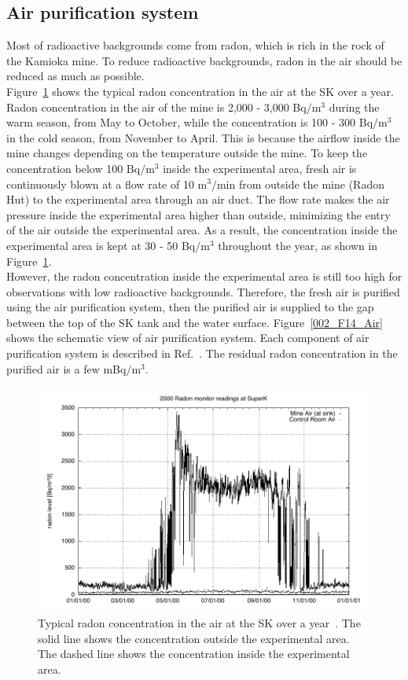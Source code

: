 \subsection{Air purification system}
\vs\hs Most of radioactive backgrounds come from radon, which is rich in the rock of the Kamioka mine.
To reduce radioactive backgrounds, radon in the air should be reduced as much as possible.\\
\hs Figure~\ref{002_F15_AirSeason} shows the typical radon concentration in the air at the SK over a year.
Radon concentration in the air of the mine is 2,000 - 3,000 Bq$/$m$^{\text{3}}$ during the warm season, from May to October, while the concentration is 100 - 300 Bq$/$m$^{\text{3}}$ in the cold season, from November to April.
This is because the airflow inside the mine changes depending on the temperature outside the mine.
To keep the concentration below 100 Bq$/$m$^{\text{3}}$ inside the experimental area, fresh air is continuously blown at a flow rate of 10 m$^{\text{3}}/$min from outside the mine (Radon Hut) to the experimental area through an air duct.
The flow rate makes the air pressure inside the experimental area higher than outside, minimizing the entry of the air outside the experimental area.
As a result, the concentration inside the experimental area is kept at 30 - 50 Bq$/$m$^{\text{3}}$ throughout the year, as shown in Figure~\ref{002_F15_AirSeason}.\\
\hs However, the radon concentration inside the experimental area is still too high for observations with low radioactive backgrounds.
Therefore, the fresh air is purified using the air purification system, then the purified air is supplied to the gap between the top of the SK tank and the water surface.
Figure~\ref{002_F14_Air} shows the schematic view of air purification system.
Each component of air purification system is described in Ref.~\cite{2015NakanoPhD}.
The residual radon concentration in the purified air is a few mBq$/$m$^{\text{3}}$.

\begin{figure}[h]
	\centering
	\includegraphics[width=12cm]{Figures/002/F15_AirSeason}
	\caption[Typical radon concentration in the air at the SK over a year]{\label{002_F15_AirSeason} Typical radon concentration in the air at the SK over a year~\cite{2003Fukuda}. The solid line shows the concentration outside the experimental area. The dashed line shows the concentration inside the experimental area.}
\end{figure}


